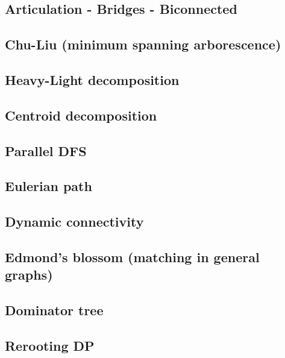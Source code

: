 \begin{multicols}{2}
\subsection{Articulation - Bridges - Biconnected}

\subsection{Chu-Liu (minimum spanning arborescence)}

\subsection{Heavy-Light decomposition}

\subsection{Centroid decomposition}

\subsection{Parallel DFS}

\subsection{Eulerian path}

\subsection{Dynamic connectivity}

\subsection{Edmond's blossom (matching in general graphs)}

\subsection{Dominator tree}

\subsection{Rerooting DP}


\end{multicols}
